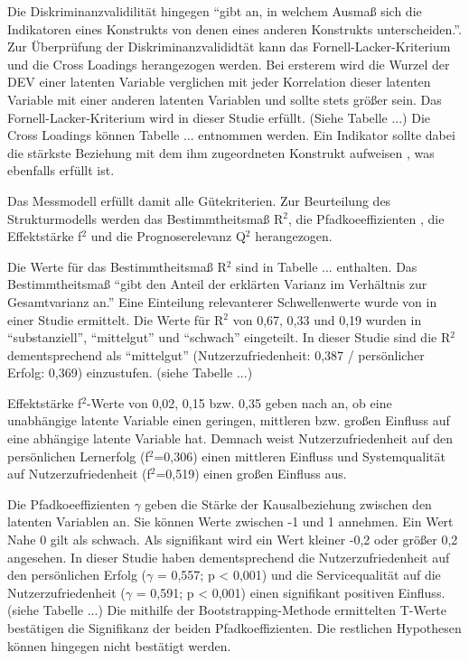 Die Diskriminanzvalidilität hingegen "`gibt an, in welchem Ausmaß sich die Indikatoren eines Konstrukts von denen eines anderen Konstrukts unterscheiden."'\parencite[S.26]{nitzl2010anwenderorientierte}. Zur Überprüfung der Diskriminanzvalididtät kann das Fornell-Lacker-Kriterium und die Cross Loadings herangezogen werden. 
Bei ersterem wird die Wurzel der DEV einer latenten Variable verglichen mit jeder Korrelation dieser latenten Variable mit einer anderen latenten Variablen und sollte stets größer sein.\parencite[vgl.][S.26]{nitzl2010anwenderorientierte} Das Fornell-Lacker-Kriterium wird in dieser Studie erfüllt. (Siehe Tabelle ...) Die Cross Loadings können Tabelle ... entnommen werden. Ein Indikator sollte dabei die stärkste Beziehung mit dem ihm zugeordneten Konstrukt aufweisen \parencite[vgl.][S.26]{nitzl2010anwenderorientierte}, was ebenfalls erfüllt ist.   \nocite{fornell1981evaluating}

Das Messmodell erfüllt damit alle Gütekriterien. Zur Beurteilung des Strukturmodells werden das Bestimmtheitsmaß R$^2$, die Pfadkoeeffizienten , die Effektstärke f$^2$ und die Prognoserelevanz Q$^2$ herangezogen.  

Die Werte für das Bestimmtheitsmaß R$^2$ sind in Tabelle ... enthalten. Das Bestimmtheitsmaß "`gibt den Anteil der erklärten Varianz im Verhältnis zur Gesamtvarianz an."'\parencite[S.32]{nitzl2010anwenderorientierte} Eine Einteilung relevanterer Schwellenwerte wurde von \cite[S.323]{chin1998partial} in einer Studie ermittelt. Die Werte für R$^2$ von 0,67, 0,33 und 0,19 wurden in "`substanziell"', "`mittelgut"' und "`schwach"' eingeteilt. In dieser Studie sind die R$^2$ dementsprechend als "`mittelgut"' (Nutzerzufriedenheit: 0,387 / persönlicher Erfolg: 0,369) einzustufen. (siehe Tabelle ...)

Effektstärke f$^2$-Werte von 0,02, 0,15 bzw. 0,35 geben nach \cite[S.316f.]{chin1998partial} an, ob eine unabhängige latente Variable einen geringen, mittleren bzw. großen Einfluss auf eine abhängige latente Variable hat. Demnach weist Nutzerzufriedenheit auf den persönlichen Lernerfolg (f$^2$=0,306) einen mittleren Einfluss und Systemqualität auf Nutzerzufriedenheit (f$^2$=0,519) einen großen Einfluss aus. 

Die Pfadkoeeffizienten $\gamma$ geben die Stärke der Kausalbeziehung zwischen den latenten Variablen an. Sie können Werte zwischen -1 und 1 annehmen. Ein Wert Nahe 0 gilt als schwach. Als signifikant wird ein Wert kleiner -0,2 oder größer 0,2 angesehen.\parencite[vgl.][S.11]{chin1998commentary} In dieser Studie haben dementsprechend die Nutzerzufriedenheit auf den persönlichen Erfolg ($\gamma$ = 0,557; p < 0,001) und die Servicequalität auf die Nutzerzufriedenheit ($\gamma$ = 0,591; p < 0,001) einen signifikant positiven Einfluss. (siehe Tabelle ...) Die mithilfe der Bootstrapping-Methode ermittelten T-Werte bestätigen die Signifikanz der beiden Pfadkoeffizienten. Die restlichen Hypothesen können hingegen nicht bestätigt werden. 

